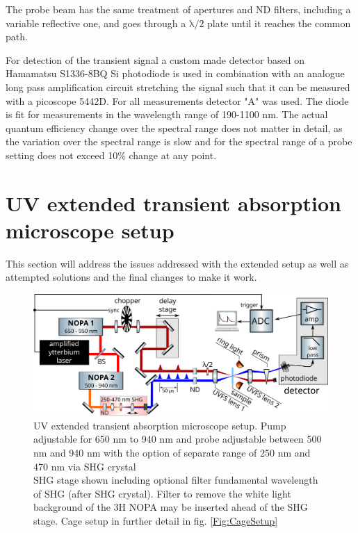 \documentclass[twoside,openright]{scrreprt}
\begin{document}
The probe beam has the same treatment of apertures and ND filters, including a variable reflective one, and goes through a $\mathrm{\lambda/2}$ plate until it reaches the common path.


For detection of the transient signal a custom made detector based on Hamamatsu S1336-8BQ Si photodiode is used in combination with an analogue long pass amplification circuit stretching the signal such that it can be measured with a picoscope 5442D. For all measurements detector "A" was used. The diode is fit for measurements in the wavelength range of 190-1100 nm. The actual quantum efficiency change over the spectral range does not matter in detail, as the variation over the spectral range is slow and for the spectral range of a probe setting does not exceed 10\% change at any point.

\section{UV extended transient absorption microscope setup}
This section will address the issues addressed with the extended setup as well as attempted solutions and the final changes to make it work.

\begin{figure}[h]
\centering
\includegraphics[width=0.9\linewidth]{images/ComponentLibrary_svg/experimental_tam_shg_swapped.png}
\caption{UV extended transient absorption microscope setup. Pump adjustable for 650 nm to 940 nm and probe adjustable between 500 nm and 940 nm with the option of separate range of 250 nm and 470 nm via SHG crystal\\
SHG stage shown including optional filter fundamental wavelength of SHG (after SHG crystal). Filter to remove the white light background of the 3H NOPA may be inserted ahead of the SHG stage. Cage setup in further detail in fig. \ref{Fig:CageSetup}}
\end{figure}
\end{document}
